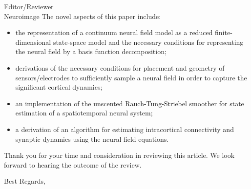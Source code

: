 \documentclass[a4paper,10pt]{letter}
\begin{document}
\begin{letter}{Editor/Reviewer \\ Neuroimage}
The novel aspects of this paper include:
\begin{itemize}
	\item the representation of a continuum neural field model as a reduced finite-dimensional state-space model and the necessary conditions for representing the neural field by a basis function decomposition;
	\item derivations of the necessary conditions for placement and geometry of sensors/electrodes to sufficiently sample a neural field in order to capture the significant cortical dynamics;
	\item an implementation of the unscented Rauch-Tung-Striebel smoother for state estimation of a spatiotemporal neural system;
	\item a derivation of an algorithm for estimating intracortical connectivity and synaptic dynamics using the neural field equations.
\end{itemize}


Thank you for your time and consideration in reviewing this article. We look forward to hearing the outcome of the review.

\closing{Best Regards,}

% 
\end{letter}
\end{document}

